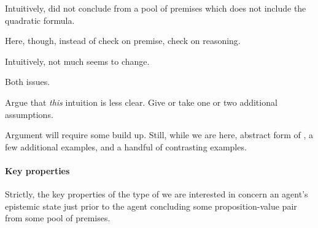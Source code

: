 \begin{note}
  Intuitively, did not conclude from a pool of premises which does not include the quadratic formula.
\end{note}

\begin{note}
  Here, though, instead of check on premise, check on reasoning.
\end{note}

\begin{note}
  Intuitively, not much seems to change.

  Both issues.

  Argue that \emph{this} intuition is less clear.
  Give or take one or two additional assumptions.

  Argument will require some build up.
  Still, while we are here, abstract form of , a few additional examples, and a handful of contrasting examples.
\end{note}

\paragraph{Key properties}

\begin{note}
  Strictly, the key properties of the type of  we are interested in concern an agent's epistemic state just prior to the agent concluding some proposition-value pair from some pool of premises.
\end{note}


